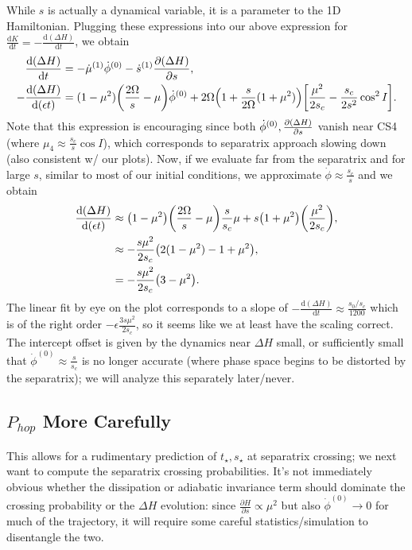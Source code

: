 \documentclass[11pt,
        usenames, %
        dvipsnames %
    ]{article}
\newcommand*{\rd}[2]{\frac{\mathrm{d}#1}{\mathrm{d}#2}}
\newcommand*{\pd}[2]{\frac{\partial#1}{\partial#2}}
\DeclarePairedDelimiter\p{\lparen}{\rparen}
\DeclarePairedDelimiter\s{\lbrack}{\rbrack}
\begin{document}
While $s$ is actually a dynamical variable, it is a parameter to the 1D
Hamiltonian. Plugging these expressions into our above expression for $\rd{K}{t}
= -\rd{(\Delta H)}{t}$, we obtain
\begin{align}
    \rd{(\Delta H)}{t} &= -\dot{\mu}^{(1)}\dot{\phi}^{(0)} - \dot{s}^{(1)}
            \pd{(\Delta H)}{s},\\
    -\rd{(\Delta H)}{(\epsilon t)} &= (1 - \mu^2)\p*{\frac{2\Omega}{s} - \mu}
            \dot{\phi}^{(0)} + 2\Omega\p*{1 + \frac{s}{2\Omega}(1 + \mu^2)}
            \s*{\frac{\mu^2}{2s_c} - \frac{s_c}{2s^2}\cos^2 I}.
\end{align}
Note that this expression is encouraging since both $\dot{\phi}^{(0)},
\pd{\p*{\Delta H}}{s}$ vanish near CS4 (where $\mu_4 \approx \frac{s_c}{s}\cos
I$), which corresponds to separatrix approach slowing down (also consistent w/
our plots). Now, if we evaluate far from the separatrix and for large $s$,
similar to most of our initial conditions, we approximate $\dot{\phi} \approx
\frac{s_c}{s}$ and we obtain
\begin{align}
    \rd{(\Delta H)}{(\epsilon t)} &\approx
            \p*{1 - \mu^2}\p*{\frac{2\Omega}{s} - \mu}\frac{s}{s_c}\mu
                + s\p*{1 + \mu^2}\p*{\frac{\mu^2}{2s_c}},\nonumber\\
        &\approx -\frac{s\mu^2}{2s_c} \p*{2(1 - \mu^2) - 1 + \mu^2}
            ,\nonumber\\
        &= -\frac{s\mu^2}{2s_c}\p*{3 - \mu^2}.
\end{align}
The linear fit by eye on the plot corresponds to a slope of $-\rd{(\Delta H)}{t}
\approx \frac{s_0/s_c}{1200}$ which is of the right order $-\epsilon
\frac{3s\mu^2}{2s_c}$, so it seems like we at least have the scaling correct.
The intercept offset is given by the dynamics near $\Delta H$ small, or
sufficiently small that $\dot{\phi}^{(0)} \approx \frac{s}{s_c}$ is no longer
accurate (where phase space begins to be distorted by the separatrix); we will
analyze this separately later/never.

\subsection{$P_{hop}$ More Carefully}

This allows for a rudimentary prediction of $t_{\star}, s_{\star}$ at separatrix
crossing; we next want to compute the separatrix crossing probabilities. It's
not immediately obvious whether the dissipation or adiabatic invariance term
should dominate the crossing probability or the $\Delta H$ evolution: since
$\pd{H}{s} \propto \mu^2$ but also $\dot{\phi}^{(0)} \to 0$ for much of the
trajectory, it will require some careful statistics/simulation to disentangle
the two.
\end{document}
